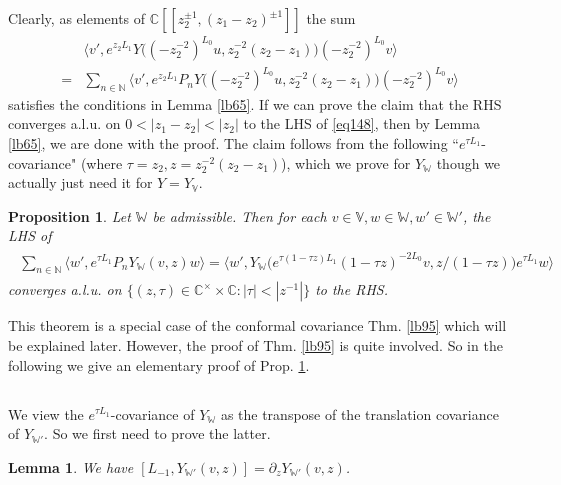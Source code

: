 \documentclass[12pt,a4paper,notitlepage]{article}
\theoremstyle{definition}
\theoremstyle{plain}
\newtheorem{pp}[df]{Proposition}
\newtheorem{lm}[df]{Lemma}
\newcommand{\bigbk}[1]{\big\langle {#1}\big\rangle}
\newcommand{\Vbb}{\mathbb V}
\newcommand{\Wbb}{\mathbb W}
\newcommand{\Cbb}{\mathbb C}
\newcommand{\Nbb}{\mathbb N}
\numberwithin{equation}{section}
\begin{document}
Clearly, as elements of $\Cbb[[z_2^{\pm1},(z_1-z_2)^{\pm1}]]$ the sum
\begin{align}
&\bigbk{v',e^{z_2L_1}Y\big((-z_2^{-2})^{L_0}u,z_2^{-2}(z_2-z_1)\big)(-z_2^{-2})^{L_0}v}\nonumber\\
=&\sum_{n\in\Nbb}\bigbk{v',e^{z_2L_1}P_nY\big((-z_2^{-2})^{L_0}u,z_2^{-2}(z_2-z_1)\big)(-z_2^{-2})^{L_0}v}	\label{eq147}
\end{align}
satisfies the conditions in Lemma \ref{lb65}. If we can prove the claim that the RHS converges a.l.u. on $0<|z_1-z_2|<|z_2|$ to the LHS of \eqref{eq148},
then by Lemma \ref{lb65}, we are done with the proof. The claim follows from the following ``$e^{\tau L_1}$-covariance" (where $\tau=z_2,z=z_2^{-2}(z_2-z_1)$), which we prove for $Y_\Wbb$ though we actually just need it for $Y=Y_\Vbb$.


\begin{pp}\label{lb90}
Let $\Wbb$ be admissible. Then for each $v\in\Vbb,w\in\Wbb,w'\in\Wbb'$, the LHS of
\begin{align}\label{eq151}
\begin{aligned}
\sum_{n\in\Nbb}\bigbk{w',e^{\tau L_1}P_nY_\Wbb(v,z)w}=\bigbk{w',Y_\Wbb\big(e^{\tau(1-\tau z)L_1}(1-\tau z)^{-2L_0}v,z/(1-\tau z)\big)e^{\tau L_1}w}
\end{aligned}	
\end{align}
converges a.l.u. on $\{(z,\tau)\in\Cbb^\times\times\Cbb:|\tau|<|z^{-1}|\}$ to the RHS.
\end{pp}


This theorem is a special case of the conformal covariance Thm. \ref{lb95} which will be explained later. However, the proof of Thm. \ref{lb95} is quite involved. So in the following we give an elementary proof of Prop. \ref{lb90}.






\subsection{}


We view the $e^{\tau L_1}$-covariance of $Y_\Wbb$ as the transpose of the translation covariance of $Y_{\Wbb'}$. So we first need to prove the latter.


\begin{lm}
We have $[L_{-1},Y_{\Wbb'}(v,z)]=\partial_zY_{\Wbb'}(v,z)$.\label{eq136}
\end{lm}
\end{document}
